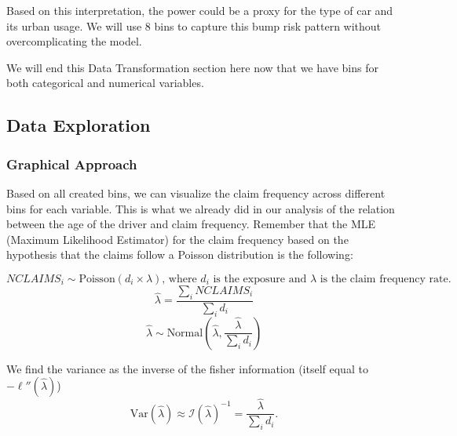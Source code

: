 \documentclass[
  english,
  11pt,
]{article}
\newenvironment{Shaded}{\begin{snugshade}}{\end{snugshade}}
\newcommand{\AttributeTok}[1]{\textcolor[rgb]{0.13,0.29,0.53}{#1}}
\newcommand{\ConstantTok}[1]{\textcolor[rgb]{0.56,0.35,0.01}{#1}}
\newcommand{\DecValTok}[1]{\textcolor[rgb]{0.00,0.00,0.81}{#1}}
\newcommand{\FunctionTok}[1]{\textcolor[rgb]{0.13,0.29,0.53}{\textbf{#1}}}
\newcommand{\NormalTok}[1]{#1}
\newcommand{\OtherTok}[1]{\textcolor[rgb]{0.56,0.35,0.01}{#1}}
\newcommand{\SpecialCharTok}[1]{\textcolor[rgb]{0.81,0.36,0.00}{\textbf{#1}}}
\newcommand{\StringTok}[1]{\textcolor[rgb]{0.31,0.60,0.02}{#1}}
\begin{document}
Based on this interpretation, the power could be a proxy for the type of
car and its urban usage. We will use 8 bins to capture this bump risk
pattern without overcomplicating the model.

\begin{Shaded}
\end{Shaded}

We will end this Data Transformation section here now that we have bins
for both categorical and numerical variables.

\subsection{Data Exploration}\label{data-exploration}

\subsubsection{Graphical Approach}\label{graphical-approach}

Based on all created bins, we can visualize the claim frequency across
different bins for each variable. This is what we already did in our
analysis of the relation between the age of the driver and claim
frequency. Remember that the MLE (Maximum Likelihood Estimator) for the
claim frequency based on the hypothesis that the claims follow a Poisson
distribution is the following:

\[NCLAIMS_{i} \sim \text{Poisson}(d_i\times \lambda) \text{, where } d_i \text{ is the exposure and } \lambda \text{ is the claim frequency rate.}\]
\[\hat{\lambda} = \frac{\sum_i NCLAIMS_i}{\sum_i d_i}\]
\[\hat{\lambda} \sim \text{Normal}\left(\hat{\lambda}, \frac{\hat{\lambda}}{\sum_i d_i}\right)\]

We find the variance as the inverse of the fisher information (itself
equal to \(-\ell''(\widehat{\lambda})\))
\[\text{Var}(\widehat{\lambda}) \approx \mathcal{I}(\widehat{\lambda})^{-1} = \frac{\widehat{\lambda}}{\sum_i d_i}.\]
\end{document}

